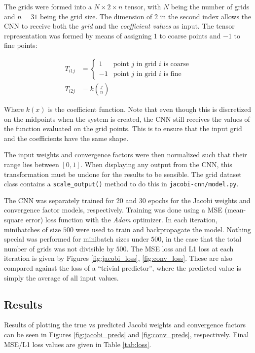 The grids were formed into a $N\times 2 \times n$ tensor, with $N$ being the number of grids and $n=31$ being the grid size.  The dimension of $2$ in the second index allows the CNN to receive both the \textit{grid} and the \textit{coefficient values} as input.  The tensor representation was formed by means of assigning $1$ to coarse points and $-1$ to fine points:

\begin{align*}
T_{i1j} &= \begin{cases}
1 & \text{point $j$ in grid $i$ is coarse}\\
-1 & \text{point $j$ in grid $i$ is fine}
\end{cases}\\
T_{i2j} &= k\left(\frac{j}{n}\right)
\end{align*}

Where $k\left(x\right)$ is the coefficient function.  Note that even though this is discretized on the midpoints when the system is created, the CNN still receives the values of the function evaluated on the grid points.  This is to ensure that the input grid and the coefficients have the same shape.

The input weights and convergence factors were then normalized such that their range lies between $\left[0, 1\right]$.  When displaying any output from the CNN, this transformation must be undone for the results to be sensible.  The grid dataset class contains a \texttt{scale\_output()} method to do this in \texttt{jacobi-cnn/model.py}.

The CNN was separately trained for 20 and 30 epochs for the Jacobi weights and convergence factor models, respectively.  Training was done using a MSE (mean-square error) loss function with the \textit{Adam} optimizer.  In each iteration, minibatches of size $500$ were used to train and backpropagate the model.  Nothing special was performed for minibatch sizes under $500$, in the case that the total number of grids was not divisible by $500$.  The MSE loss and L1 loss at each iteration is given by Figures \ref{fig:jacobi_loss}, \ref{fig:conv_loss}.  These are also compared against the loss of a ``trivial predictor'', where the predicted value is simply the average of all input values.

\subsection{Results}

Results of plotting the true vs predicted Jacobi weights and convergence factors can be seen in Figures \ref{fig:jacobi_preds} and \ref{fig:conv_preds}, respectively.  Final MSE/L1 loss values are given in Table \ref{tab:loss}.

